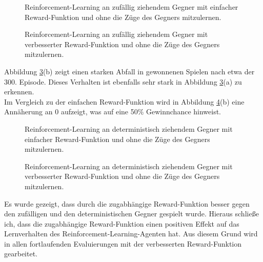 \begin{figure}%
    \centering
    \qquad
    \caption{Reinforcement-Learning an zufällig ziehendem Gegner mit einfacher Reward-Funktion und ohne die Züge des Gegners mitzulernen.}%
    \label{fig:randomFF}%
\end{figure}


\begin{figure}%
    \centering
    \qquad
    \caption{Reinforcement-Learning an zufällig ziehendem Gegner mit verbesserter Reward-Funktion und ohne die Züge des Gegners mitzulernen.}%
    \label{fig:randomTF}%
\end{figure}

Abbildung \ref{fig:leftiFF}(b) zeigt einen starken Abfall in gewonnenen Spielen nach etwa der 300. Episode. Dieses Verhalten ist ebenfalls sehr stark in Abbildung \ref{fig:leftiFF}(a) zu erkennen.\\
Im Vergleich zu der einfachen Reward-Funktion wird in Abbildung \ref{fig:leftiTF}(b) eine Annäherung an 0 aufzeigt, was auf eine 50\% Gewinnchance hinweist.\\

\begin{figure}%
    \centering
    \qquad
    \caption{Reinforcement-Learning an deterministisch ziehendem Gegner mit einfacher Reward-Funktion und ohne die Züge des Gegners mitzulernen.}%
    \label{fig:leftiFF}%
\end{figure}

\begin{figure}%
    \centering
    \qquad
    \caption{Reinforcement-Learning an deterministisch ziehendem Gegner mit verbesserter Reward-Funktion und ohne die Züge des Gegners mitzulernen.}%
    \label{fig:leftiTF}%
\end{figure}
Es wurde gezeigt, dass durch die zugabhängige Reward-Funktion besser gegen den zufälligen und den deterministischen Gegner gespielt wurde.
Hieraus schließe ich, dass die zugabhängige Reward-Funktion einen positiven Effekt auf das Lernverhalten des Reinforcement-Learning-Agenten hat.
Aus diesem Grund wird in allen fortlaufenden Evaluierungen mit der verbesserten Reward-Funktion gearbeitet.


